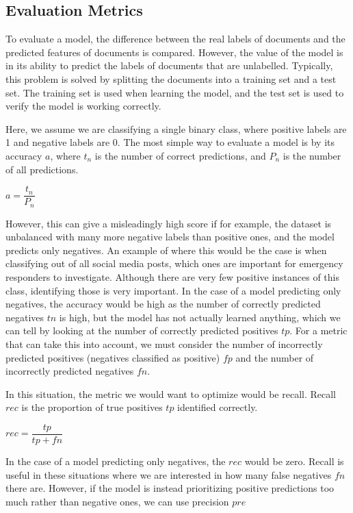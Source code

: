 \subsection{Evaluation Metrics}

To evaluate a model, the difference between the real labels of documents and the predicted features of documents is compared. However, the value of the model is in its ability to predict the labels of documents that are unlabelled. Typically, this problem is solved by splitting the documents into a training set and a test set. The training set is used when learning the model, and the test set is used to verify the model is working correctly. 

Here, we assume we are classifying a single binary class, where positive labels are 1 and negative labels are 0. The most simple way to evaluate a model is by its accuracy $a$, where ${t_n}$ is the number of correct predictions, and $P_n$ is the number of all predictions.


$a = \dfrac{t_n}{ P_n}  $


However, this can give a misleadingly high score if for example, the dataset is unbalanced with many more negative labels than positive ones, and the model predicts only negatives. An example of where this would be the case is when classifying out of all social media posts, which ones are important for emergency responders to investigate. Although there are very few positive instances of this class, identifying those is very important. In the case of a model predicting only negatives, the accuracy would be high as the number of correctly predicted negatives ${tn}$ is high, but the model has not actually learned anything, which we can tell by looking at the number of correctly predicted positives ${tp}$. For a metric that can take this into account, we must consider the number of incorrectly predicted positives (negatives classified as positive) ${fp}$ and the number of incorrectly predicted negatives ${fn}$.

In this situation, the metric we would want to optimize would be recall. Recall ${rec}$ is the proportion of true positives ${tp}$ identified correctly. 

${rec} = \dfrac{{tp}}{{tp} + {fn}}$

In the case of a model predicting only negatives, the ${rec}$ would be zero. Recall is useful in these situations where we are interested in how many false negatives ${fn}$ there are. However, if the model is instead prioritizing positive predictions too much rather than negative ones, we can use precision ${pre}$

